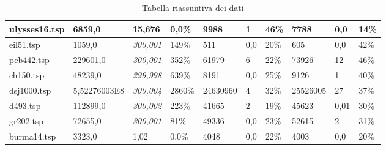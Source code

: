 \begin{landscape}
\begin{table}[]
\begin{tabular}{|l|l|l|l|l|l|l|l|l|l|}
			\rowcolor[HTML]{C0C0C0} 
			ulysses16.tsp                                            & 6859,0                    & 15,676              & 0,0\%                & 9988                      & 1                   & 46\%                 & 7788                      & 0,0                 & 14\%                 \\ \hline
			eil51.tsp                                                & 1059,0                    & \textit{300,001}    & 149\%                & 511                       & 0,0                 & 20\%                 & 605                       & 0,0                 & 42\%                 \\ \hline
			\rowcolor[HTML]{C0C0C0} 
			pcb442.tsp                                               & 229601,0                  & \textit{300,001}    & 352\%                & 61979                     & 6                   & 22\%                 & 73926                     & 12                  & 46\%                 \\ \hline
			ch150.tsp                                                & 48239,0                   & \textit{299,998}    & 639\%                & 8191                      & 0,0                 & 25\%                 & 9126                      & 1                   & 40\%                 \\ \hline
			\rowcolor[HTML]{C0C0C0} 
			dsj1000.tsp                                              & 5,52276003E8              & \textit{300,004}    & 2860\%               & 24630960                  & 4                   & 32\%                 & 25526005                  & 27                  & 37\%                 \\ \hline
			d493.tsp                                                 & 112899,0                  & \textit{300,002}    & 223\%                & 41665                     & 2                   & 19\%                 & 45623                     & 0,01                & 30\%                 \\ \hline
			\rowcolor[HTML]{C0C0C0} 
			gr202.tsp                                                & 72655,0                   & \textit{300,001}    & 81\%                 & 49336                     & 0,0                 & 23\%                 & 52615                     & 2                   & 31\%                 \\ \hline
			burma14.tsp                                              & 3323,0                    & 1,02                & 0,0\%                & 4048                      & 0,0                 & 22\%                 & 4003                      & 0,0                 & 20\%                 \\ \hline
		\end{tabular}
		\caption{Tabella riassuntiva dei dati}
		\label{tab:times}
	\end{table}
\end{landscape}